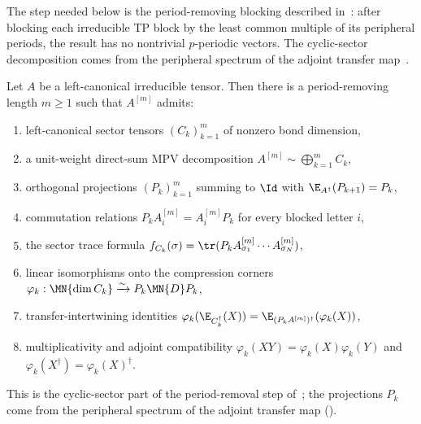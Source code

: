 The step needed below is the period-removing blocking described
in~\cite[Section~2.3]{Cirac2016MPDO_arXiv}: after blocking each irreducible TP
block by the least common multiple of its peripheral periods, the result has no
nontrivial $p$-periodic vectors. The cyclic-sector
decomposition comes from the peripheral spectrum of the adjoint transfer
map~\cite[Theorem~6.6]{Wolf2012Quantum}.

\begin{theorem}%
    \label{thm:cyclic_sector_decomp_after_blocking}
    \leanok
    Let $A$ be a left-canonical irreducible tensor. Then there is a
    period-removing length $m\ge 1$ such that $A^{[m]}$ admits:
    \begin{enumerate}
        \item left-canonical sector tensors $(C_k)_{k=1}^m$ of nonzero bond
              dimension,
        \item a unit-weight direct-sum MPV decomposition
              $A^{[m]} \sim \bigoplus_{k=1}^m C_k$,
        \item orthogonal projections $(P_k)_{k=1}^m$ summing to $\Id$ with
              $\E_{A^\dagger}(P_{k+1}) = P_k$,
        \item commutation relations
              $P_k A^{[m]}_i = A^{[m]}_i P_k$ for every blocked letter $i$,
        \item the sector trace formula
              $f_{C_k}(\sigma)=
                  \tr(P_k A^{[m]}_{\sigma_1}\cdots A^{[m]}_{\sigma_N})$,
        \item linear isomorphisms onto the compression corners
              $\varphi_k : \MN{\dim C_k} \xrightarrow{\sim} P_k \MN{D} P_k$,
        \item transfer-intertwining identities
              $\varphi_k(\E_{C_k^\dagger}(X)) =
                  \E_{(P_kA^{[m]})^\dagger}(\varphi_k(X))$,
        \item multiplicativity and adjoint compatibility
              $\varphi_k(XY)=\varphi_k(X)\varphi_k(Y)$ and
              $\varphi_k(X^\dagger)=\varphi_k(X)^\dagger$.
    \end{enumerate}
    This is the cyclic-sector part of the period-removal step
    of~\cite[Section~2.3]{Cirac2016MPDO_arXiv}; the projections $P_k$ come
    from the peripheral spectrum of the adjoint transfer map
    (\cite[Theorem~6.6]{Wolf2012Quantum}).
\end{theorem}

